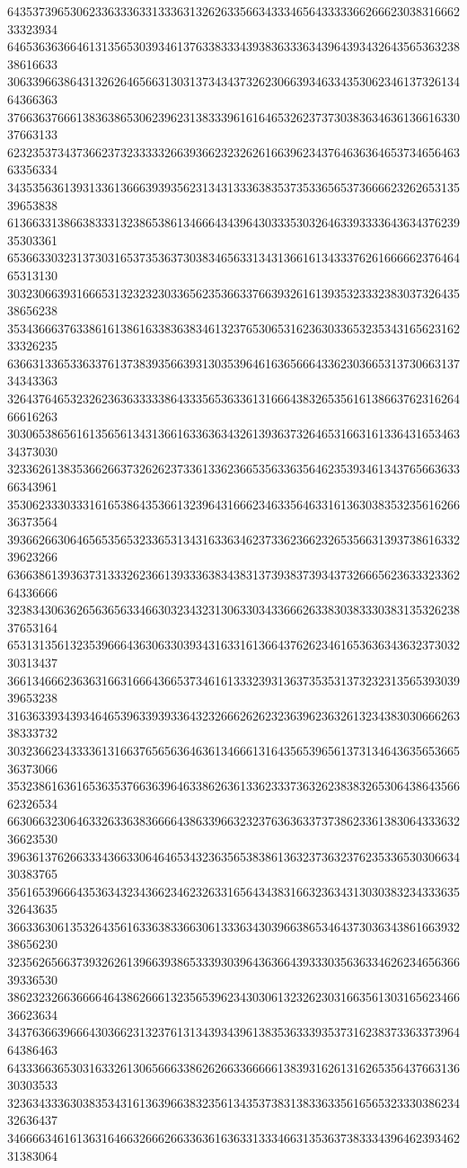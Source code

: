 64353739653062336333633133363132626335663433346564333336626662303831666233323934
64653636366461313565303934613763383334393836333634396439343264356536323838616633
30633966386431326264656631303137343437326230663934633435306234613732613464366363
37663637666138363865306239623138333961616465326237373038363463613661633037663133
62323537343736623732333332663936623232626166396234376463636465373465646363356334
34353563613931336136663939356231343133363835373533656537366662326265313539653838
61366331386638333132386538613466643439643033353032646339333364363437623935303361
65366330323137303165373536373038346563313431366161343337626166666237646465313130
30323066393166653132323230336562353663376639326161393532333238303732643538656238
35343666376338616138616338363834613237653065316236303365323534316562316233326235
63663133653363376137383935663931303539646163656664336230366531373066313734343363
32643764653232623636333338643335653633613166643832653561613866376231626466616263
30306538656161356561343136616336363432613936373264653166316133643165346334373030
32336261383536626637326262373361336236653563363564623539346134376566363366343961
35306233303331616538643536613239643166623463356463316136303835323561626636373564
39366266306465653565323365313431633634623733623662326535663139373861633239623266
63663861393637313332623661393336383438313739383739343732666562363332336264336666
32383430636265636563346630323432313063303433666263383038333038313532623837653164
65313135613235396664363063303934316331613664376262346165363634363237303230313437
36613466623636316631666436653734616133323931363735353137323231356539303939653238
31636339343934646539633939336432326662626232363962363261323438303066626338333732
30323662343333613166376565636463613466613164356539656137313464363565366536373066
35323861636165363537663639646338626361336233373632623838326530643864356662326534
66306632306463326336383666643863396632323763636337373862336138306433363236623530
39636137626633343663306464653432363565383861363237363237623533653030663430383765
35616539666435363432343662346232633165643438316632363431303038323433363532643635
36633630613532643561633638336630613336343039663865346437303634386166393238656230
32356265663739326261396639386533393039643636643933303563633462623465636639336530
38623232663666646438626661323565396234303061323262303166356130316562346636623634
34376366396664303662313237613134393439613835363339353731623837336337396464386463
64333663653031633261306566633862626633666661383931626131626535643766313630303533
32363433363038353431613639663832356134353738313833633561656532333038623432636437
34666634616136316466326662663363616363313334663135363738333439646239346231383064
